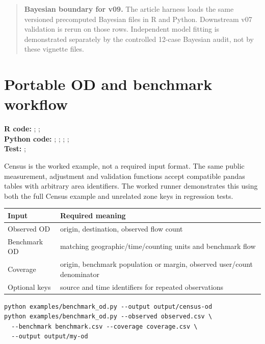 \documentclass[10pt]{article}
\newenvironment{boundarybox}
  {\begin{quote}\color{blue!55!black}}
  {\end{quote}}
\begin{document}
\begin{boundarybox}
\textbf{Bayesian boundary for v09.} The article harness
loads the same versioned precomputed Bayesian files in R and Python. Downstream
v07 validation is rerun on those rows. Independent model fitting is demonstrated
separately by the controlled 12-case Bayesian audit, not by these vignette files.
\end{boundarybox}


\section{Portable OD and benchmark workflow}
{\footnotesize \textbf{R code:} ; ; \\ \textbf{Python code:} ; ; ; ; \\ \textbf{Test:} ; \par}


Census is the worked example, not a required input format. The same public
measurement, adjustment and validation functions accept compatible pandas
tables with arbitrary area identifiers. The worked runner demonstrates this
using both the full Census example and unrelated zone keys in regression tests.

\begin{tabularx}{\textwidth}{@{}lX@{}}
\toprule
Input & Required meaning \\
\midrule
Observed OD & origin, destination, observed flow count \\
Benchmark OD & matching geographic/time/counting units and benchmark flow \\
Coverage & origin, benchmark population or margin, observed user/count denominator \\
Optional keys & source and time identifiers for repeated observations \\
\bottomrule
\end{tabularx}

\begin{verbatim}
python examples/benchmark_od.py --output output/census-od
python examples/benchmark_od.py --observed observed.csv \
  --benchmark benchmark.csv --coverage coverage.csv \
  --output output/my-od
\end{verbatim}
\end{document}
